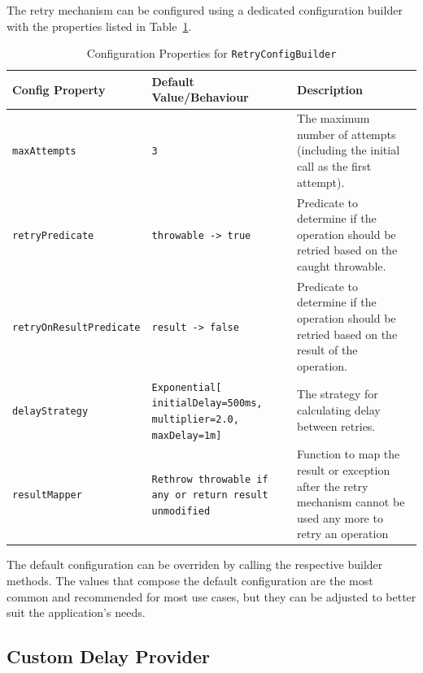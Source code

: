 The retry mechanism can be configured using a dedicated configuration builder with the properties listed in Table~\ref{tab:retry-config-builder}.

\begin{table}[!htb]
    \centering
    \caption{Configuration Properties for \texttt{RetryConfigBuilder}}
    \label{tab:retry-config-builder}
    \vspace{0.3cm}
    \begin{tabular}{|l|p{5cm}|p{6cm}|}
        \hline
        \textbf{Config Property}        & \textbf{Default Value/Behaviour}                                       & \textbf{Description}                                                                            \\ \hline
        \texttt{maxAttempts}            & \texttt{3}                                                             & The maximum number of attempts (including the initial call as the first attempt).               \\ \hline
        \texttt{retryPredicate}         & \texttt{throwable -> true}                                             & Predicate to determine if the operation should be retried based on the caught throwable.        \\ \hline
        \texttt{retryOnResultPredicate} & \texttt{result -> false}                                               & Predicate to determine if the operation should be retried based on the result of the operation. \\ \hline
        \texttt{delayStrategy}          & \texttt{Exponential[ initialDelay=500ms, multiplier=2.0, maxDelay=1m]}          & The strategy for calculating delay between retries.                                             \\ \hline
        \texttt{resultMapper} & \texttt{Rethrow throwable
        if any or return result unmodified}          & Function
        to map the result or exception after the retry mechanism cannot be used any more to retry an operation                            \\ \hline
    \end{tabular}
\end{table}

The default configuration can be overriden by calling the respective builder methods.
The values that compose the default configuration are the most common and recommended for most use cases, but they can be adjusted to better suit the application's needs.

\subsection{Custom Delay Provider}\label{subsec:retry-custom-delay-provider}

